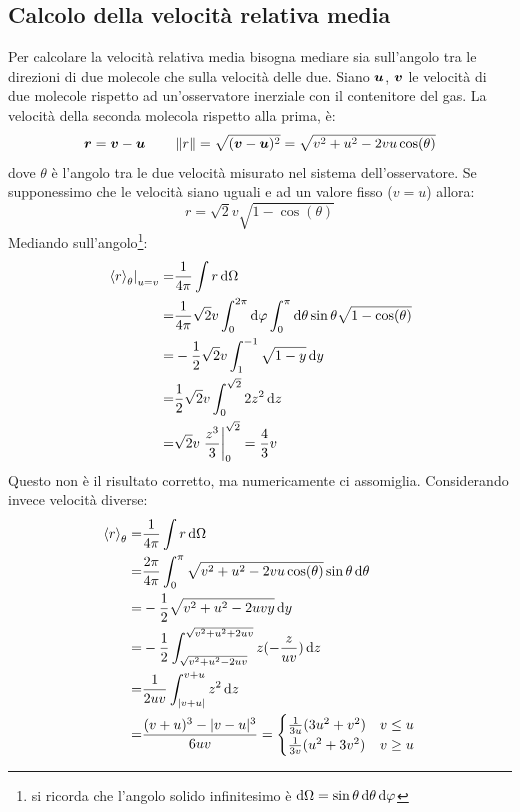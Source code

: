 \subsection{Calcolo della velocità relativa media}
\label{calcolo_vel_rel_med}
Per calcolare la velocità relativa media bisogna mediare sia sull'angolo tra le direzioni di due molecole che sulla velocità delle due. Siano $\boldsymbol{u}$, $\boldsymbol{v}$ le velocità di due molecole rispetto ad un'osservatore inerziale con il contenitore del gas. La velocità della seconda molecola rispetto alla prima, è:
\[
	\boldsymbol{r} = \boldsymbol{v} - \boldsymbol{u} \qquad \left\lVert r\right\rVert = \sqrt{(\boldsymbol{v}-\boldsymbol{u})^2} = \sqrt{v^2+u^2-2vu\cos(\theta)}
\]
dove $\theta$ è l'angolo tra le due velocità misurato nel sistema dell'osservatore. Se supponessimo che le velocità siano uguali e ad un valore fisso ($v=u$) allora:
\[
	r = \sqrt{2}v\sqrt{1-\cos(\theta)}
\]
Mediando sull'angolo\footnote{si ricorda che l'angolo solido infinitesimo è $\mathrm{d}\Omega=\sin\theta\,\mathrm{d}\theta\,\mathrm{d}\varphi$}:
\begin{align*}
	\left.\left<r\right>_{\theta}\right|_{u=v} = & \frac{1}{4\pi}\int r\,\mathrm{d}\Omega                                                                   \\
	=                                       & \frac{1}{4\pi}\sqrt{2}v\int_0^{2\pi}\mathrm{d}\varphi\int_0^\pi \mathrm{d}\theta\sin\theta\sqrt{1-\cos(\theta)} \\
	=                                       & -\frac{1}{2}\sqrt{2}v\int_{1}^{-1} \sqrt{1-y}\,\mathrm{d} y                                              \\
	=                                       & \frac{1}{2}\sqrt{2}v\int_0^{\sqrt{2}} 2z^2\,\mathrm{d} z                                                 \\
	=                                       & \sqrt{2}v\left.\frac{z^3}{3}\right|_0^{\sqrt{2}}=\frac{4}{3}v
\end{align*}
Questo non è il risultato corretto, ma numericamente ci assomiglia. Considerando invece velocità diverse:
\begin{align*}
	\left<r\right>_\theta = & \frac{1}{4\pi}\int r\,\mathrm{d}\Omega                                                     \\
	=                  & \frac{2\pi}{4\pi}\int_0^\pi \sqrt{v^2+u^2-2vu\cos(\theta)}\sin\theta\,\mathrm{d}\theta     \\
	=                  & -\frac{1}{2}\sqrt{v^2+u^2-2uvy}\,\mathrm{d} y                                              \\
	=                  & -\frac{1}{2}\int_{\sqrt{v^2+u^2-2uv}}^{\sqrt{v^2+u^2+2uv}} z (-\frac{z}{uv})\,\mathrm{d} z \\
	=                  & \frac{1}{2uv}\int_{|v+u|}^{v+u} z^2\,\mathrm{d} z                                          \\
	=                  & \frac{(v+u)^3-|v-u|^3}{6uv}=\begin{cases}
		\frac{1}{3u}(3u^2+v^2) & v \leq u \\
		\frac{1}{3v}(u^2+3v^2) & v \geq u
	\end{cases}
\end{align*}
